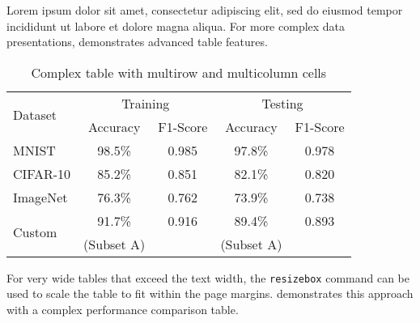 Lorem ipsum dolor sit amet, consectetur adipiscing elit, sed do eiusmod tempor incididunt ut labore et dolore magna aliqua. For more complex data presentations,  demonstrates advanced table features.

\begin{table}[htbp]
\centering
\caption{Complex table with multirow and multicolumn cells}
\label{tab:complex}
\begin{tabular}{@{}lcccc@{}}
\toprule
\multirow{2}{*}{Dataset} & \multicolumn{2}{c}{Training} & \multicolumn{2}{c}{Testing} \\
\cmidrule(lr){2-3} \cmidrule(lr){4-5}
& Accuracy & F1-Score & Accuracy & F1-Score \\
\midrule
MNIST & 98.5\% & 0.985 & 97.8\% & 0.978 \\
CIFAR-10 & 85.2\% & 0.851 & 82.1\% & 0.820 \\
ImageNet & 76.3\% & 0.762 & 73.9\% & 0.738 \\
\multirow{2}{*}{Custom} & 91.7\% & 0.916 & 89.4\% & 0.893 \\
& (Subset A) & & (Subset A) & \\
\bottomrule
\end{tabular}
\end{table}

For very wide tables that exceed the text width, the \texttt{resizebox} command can be used to scale the table to fit within the page margins.  demonstrates this approach with a complex performance comparison table.


